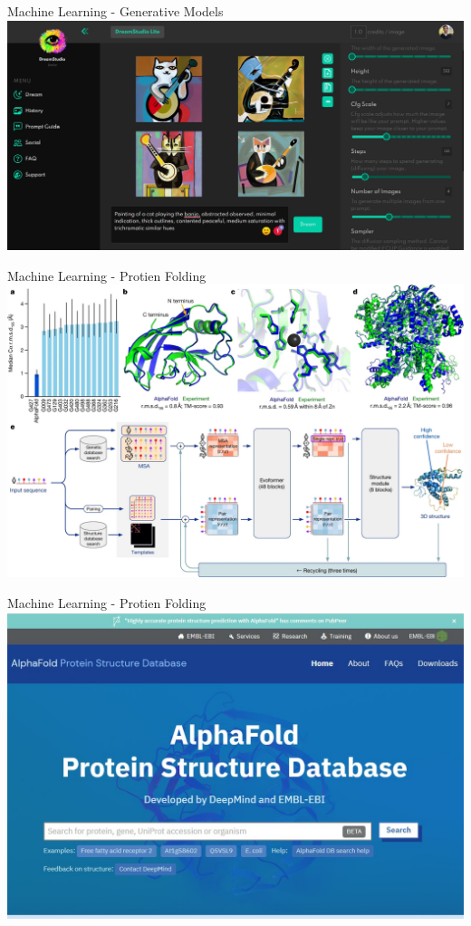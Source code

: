 \documentclass[]{beamer}
\begin{document}
\begin{frame}{Machine Learning - Generative Models}
    \includegraphics[width=\textwidth]{imgs/vis_7.jpg}
\end{frame}



\begin{frame}{Machine Learning - Protien Folding}
    \includegraphics[width=\textwidth]{imgs/vis_9.jpg}
\end{frame}

\begin{frame}{Machine Learning - Protien Folding}
    \includegraphics[width=\textwidth]{imgs/vis_8.jpg}
\end{frame}
\end{document}
